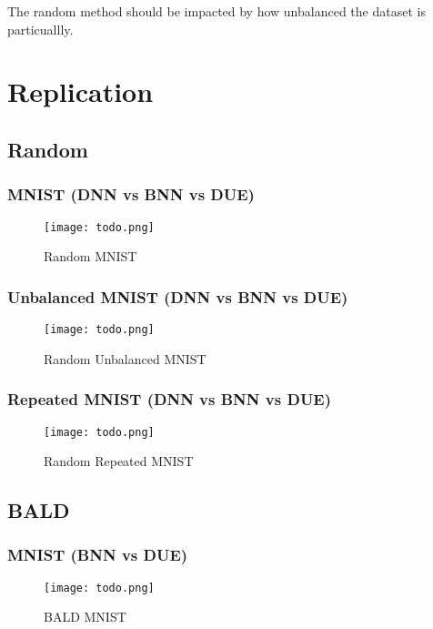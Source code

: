\documentclass[12pt, a4paper]{report}
\theoremstyle{definition}
\theoremstyle{definition}
\theoremstyle{definition}
\begin{document}
The random method should be impacted by how unbalanced the dataset is particuallly.

\section{Replication}

\subsection{Random}

\subsubsection{MNIST (DNN vs BNN vs DUE)}

\begin{figure}[H]
\centering
\texttt{[image: todo.png]}
\caption{Random MNIST}
\end{figure}

\subsubsection{Unbalanced MNIST (DNN vs BNN vs DUE)}

\begin{figure}[H]
\centering
\texttt{[image: todo.png]}
\caption{Random Unbalanced MNIST}
\end{figure}
\subsubsection{Repeated MNIST (DNN vs BNN vs DUE)}

\begin{figure}[H]
\centering
\texttt{[image: todo.png]}
\caption{Random Repeated MNIST}
\end{figure}

\subsection{BALD}

\subsubsection{MNIST (BNN vs DUE)}

\begin{figure}[H]
\centering
\texttt{[image: todo.png]}
\caption{BALD MNIST}
\end{figure}
\end{document}
